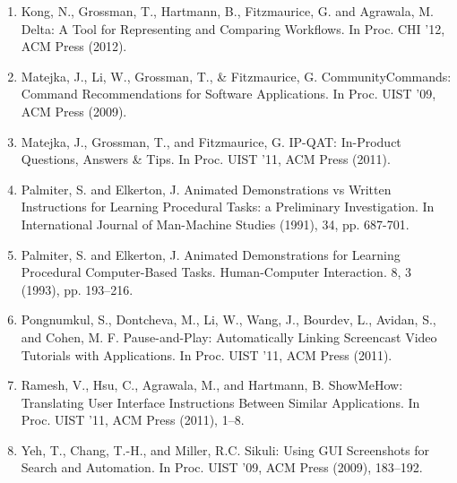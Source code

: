 \begin{enumerate}
\item \label{bkm:Ref202761498}Kong, N., Grossman, T., Hartmann, B., Fitzmaurice, G. and Agrawala, M. Delta: A Tool for Representing and Comparing Workflows. In Proc. CHI '12, ACM Press (2012).
\item \label{bkm:Ref202759227}Matejka, J., Li, W., Grossman, T., \& Fitzmaurice, G. CommunityCommands: Command Recommendations for Software Applications. In Proc. UIST '09, ACM Press (2009).
\item \label{bkm:Ref184382369}Matejka, J., Grossman, T., and Fitzmaurice, G. IP-QAT: In-Product Questions, Answers \& Tips. In Proc. UIST '11, ACM Press (2011).
\item \label{bkm:Ref184382268}Palmiter, S. and Elkerton, J. Animated Demonstrations vs Written Instructions for Learning Procedural Tasks: a Preliminary Investigation. In International Journal of Man-Machine Studies (1991), 34, pp. 687-701.\label{bkm:Ref195909769}
\item \label{bkm:Ref184382254}Palmiter, S. and Elkerton, J. Animated Demonstrations for Learning Procedural Computer-Based Tasks. Human-Computer Interaction. 8, 3 (1993), pp. 193–216.
\item \label{bkm:Ref186908980}Pongnumkul, S., Dontcheva, M., Li, W., Wang, J., Bourdev, L., Avidan, S., and Cohen, M. F. Pause-and-Play: Automatically Linking Screencast Video Tutorials with Applications. In Proc. UIST '11, ACM Press (2011).
\item \label{bkm:Ref184382359}Ramesh, V., Hsu, C., Agrawala, M., and Hartmann, B. ShowMeHow: Translating User Interface Instructions Between Similar Applications. In Proc. UIST '11, ACM Press (2011), 1–8.
\item \label{bkm:Ref202759500}Yeh, T., Chang, T.-H., and Miller, R.C. Sikuli: Using GUI Screenshots for Search and Automation. In Proc. UIST '09, ACM Press (2009), 183–192.
\end{enumerate}
